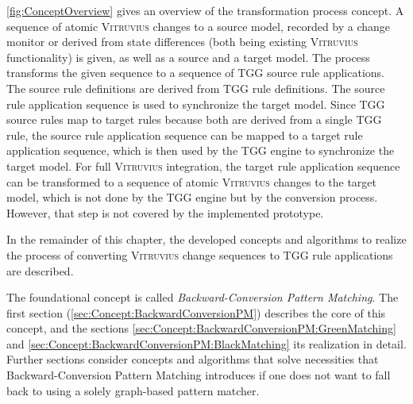 \autoref{fig:ConceptOverview} gives an overview of the transformation process concept. A sequence of atomic \textsc{Vitruvius} changes to a source model, recorded by a change monitor or derived from state differences (both being existing \textsc{Vitruvius} functionality) is given, as well as a source and a target model. The process transforms the given sequence to a sequence of TGG source rule applications. The source rule definitions are derived from TGG rule definitions. The source rule application sequence is used to synchronize the target model. Since TGG source rules map to target rules because both are derived from a single TGG rule, the source rule application sequence can be mapped to a target rule application sequence, which is then used by the TGG engine to synchronize the target model.
For full \textsc{Vitruvius} integration, the target rule application sequence can be transformed to a sequence of atomic \textsc{Vitruvius} changes to the target model, which is not done by the TGG engine but by the conversion process. However, that step is not covered by the implemented prototype.



In the remainder of this chapter, the developed concepts and algorithms to realize the process of converting \textsc{Vitruvius} change sequences to TGG rule applications are described.

The foundational concept is called \emph{Backward-Conversion Pattern Matching}.
The first section (\autoref{sec:Concept:BackwardConversionPM}) describes the core of this concept, and the sections \autoref{sec:Concept:BackwardConversionPM:GreenMatching} and \autoref{sec:Concept:BackwardConversionPM:BlackMatching} its realization in detail.
Further sections consider concepts and algorithms that solve necessities that Backward-Conversion Pattern Matching introduces if one does not want to fall back to using a solely graph-based pattern matcher.

